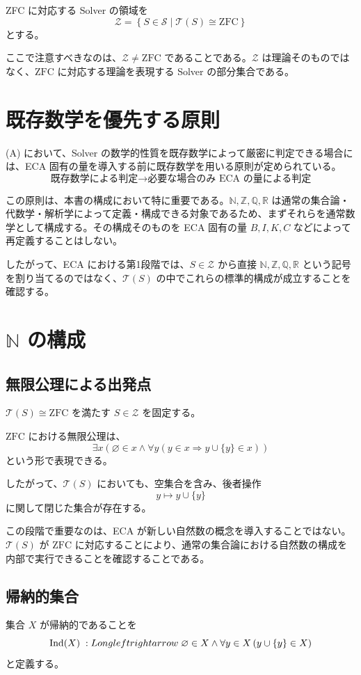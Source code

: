 \documentclass[a4paper,11pt]{article}
\newcommand{\Solver}{\mathcal{S}}
\newcommand{\ZFC}{\mathrm{ZFC}}
\begin{document}
ZFC に対応する Solver の領域を
\[
\boxed{\mathcal{Z}=\left\{S\in\Solver\mid\mathcal{T}(S)\cong\ZFC\right\}}
\]
とする。

ここで注意すべきなのは、$\mathcal{Z}\neq\ZFC$ であることである。$\mathcal{Z}$ は理論そのものではなく、$\ZFC$ に対応する理論を表現する Solver の部分集合である。

\section{既存数学を優先する原則}
(A) において、Solver の数学的性質を既存数学によって厳密に判定できる場合には、ECA 固有の量を導入する前に既存数学を用いる原則が定められている。
\[
\boxed{\text{既存数学による判定}\longrightarrow\text{必要な場合のみ ECA の量による判定}}
\]

この原則は、本書の構成において特に重要である。$\mathbb{N},\mathbb{Z},\mathbb{Q},\mathbb{R}$ は通常の集合論・代数学・解析学によって定義・構成できる対象であるため、まずそれらを通常数学として構成する。その構成そのものを ECA 固有の量 $B,I,K,C$ などによって再定義することはしない。

したがって、ECA における第1段階では、$S\in\mathcal{Z}$ から直接 $\mathbb{N},\mathbb{Z},\mathbb{Q},\mathbb{R}$ という記号を割り当てるのではなく、$\mathcal{T}(S)$ の中でこれらの標準的構成が成立することを確認する。

\section{$\mathbb{N}$ の構成}
\subsection{無限公理による出発点}
$\mathcal{T}(S)\cong\ZFC$ を満たす $S\in\mathcal{Z}$ を固定する。

$\ZFC$ における無限公理は、
\[
\exists x\left(\varnothing\in x\land\forall y\left(y\in x\Rightarrow y\cup\{y\}\in x\right)\right)
\]
という形で表現できる。

したがって、$\mathcal{T}(S)$ においても、空集合を含み、後者操作
\[
y\longmapsto y\cup\{y\}
\]
に関して閉じた集合が存在する。

この段階で重要なのは、ECA が新しい自然数の概念を導入することではない。$\mathcal{T}(S)$ が $\ZFC$ に対応することにより、通常の集合論における自然数の構成を内部で実行できることを確認することである。

\subsection{帰納的集合}
集合 $X$ が帰納的であることを
\[
\operatorname{Ind}(X)\;:\\Longleftrightarrow\;\varnothing\in X\land\forall y\in X\,(y\cup\{y\}\in X)
\]
と定義する。
\end{document}
